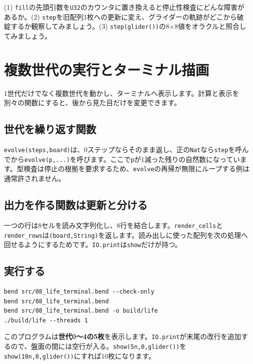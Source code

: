 \documentclass[11pt,a4paper,openany]{book}
\newcommand{\code}[1]{\texttt{#1}}
\newcommand{\term}[1]{\textbf{#1}}
\newcommand{\readcode}[2]{}
\newcommand{\exercise}[1]{\begin{exercisebox}#1\end{exercisebox}}
\begin{document}
\exercise{(1) \code{fill}の先頭引数を\code{U32}のカウンタに置き換えると停止性検査にどんな障害があるか。(2) \code{step}を旧配列1枚への更新に変え、グライダーの軌跡がどこから破綻するか観察してみましょう。(3) \code{step(glider())}の8×8値をオラクルと照合してみましょう。}

\chapter{複数世代の実行とターミナル描画}
\begin{tcolorbox}[colback=blue!3,colframe=blue!16,boxrule=.35pt,arc=1mm,left=3mm,right=3mm,top=2mm,bottom=2mm]
\small 1世代だけでなく複数世代を動かし、ターミナルへ表示します。計算と表示を別々の関数にすると、後から見た目だけを変更できます。
\end{tcolorbox}

\section{世代を繰り返す関数}
\code{evolve(steps,board)}は、0ステップならそのまま返し、正の\code{Nat}なら\code{step}を呼んでから\code{evolve(p,...)}を呼びます。ここで\code{p}が1減った残りの自然数になっています。型検査は停止の根拠を要求するため、\code{evolve}の再帰が無限にループする例は通常許されません。

\section{出力を作る関数は更新と分ける}
一つの行は8セルを読み文字列化し、8行を結合します。\code{render\_cells}と\code{render\_rows}は\code{(board,String)}を返します。読み出しに使った配列を次の処理へ回せるようにするためです。\code{IO.print}は\code{show}だけが持つ。

\readcode{08_life_terminal.bend}{完成版：5世代を表示するシミュレータ（08\_life\_terminal.bend）}

\section{実行する}
\begin{lstlisting}[language={},caption={完成版の実行}]
bend src/08_life_terminal.bend --check-only
bend src/08_life_terminal.bend
bend src/08_life_terminal.bend -o build/life
./build/life --threads 1
\end{lstlisting}
このプログラムは\term{世代0～4の5枚}を表示します。\code{IO.print}が末尾の改行を追加するので、盤面の間には空行が入る。\code{show(5n,0,glider())}を\code{show(10n,0,glider())}にすれば10枚になります。
\end{document}
